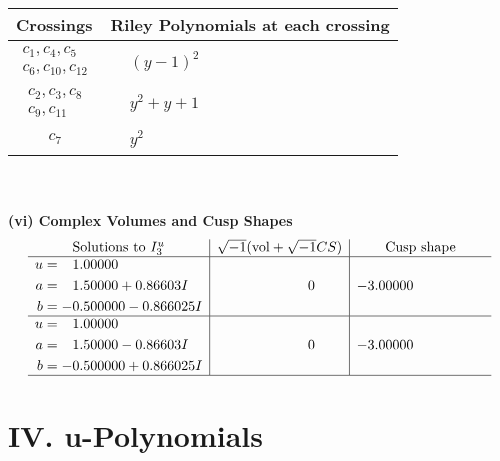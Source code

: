 \documentclass[1p]{elsarticle_modified}
\theoremstyle{definition}
\newcommand{\I}{\sqrt{-1}}
\begin{document}
\begin{tabular}{m{50pt}|m{274pt}}
Crossings & \hspace{64pt}Riley Polynomials at each crossing \\
\hline $$\begin{aligned}c_{1},c_{4},c_{5}\\c_{6},c_{10},c_{12}\end{aligned}$$&$\begin{aligned}
&(y-1)^2
\end{aligned}$\\
\hline $$\begin{aligned}c_{2},c_{3},c_{8}\\c_{9},c_{11}\end{aligned}$$&$\begin{aligned}
&y^2+y+1
\end{aligned}$\\
\hline $$\begin{aligned}c_{7}\end{aligned}$$&$\begin{aligned}
&y^2
\end{aligned}$\\
\hline
\end{tabular}\\~\\
\newpage\flushleft \textbf{(vi) Complex Volumes and Cusp Shapes}
$$\begin{array}{c|c|c}  
\text{Solutions to }I^u_{3}& \I (\text{vol} + \sqrt{-1}CS) & \text{Cusp shape}\\
 \hline 
\begin{aligned}
u &= \phantom{-}1.00000\phantom{ +0.000000I} \\
a &= \phantom{-}1.50000 + 0.86603 I \\
b &= -0.500000 - 0.866025 I\end{aligned}
 & \phantom{-0.000000 } 0 & -3.00000\phantom{ +0.000000I} \\ \hline\begin{aligned}
u &= \phantom{-}1.00000\phantom{ +0.000000I} \\
a &= \phantom{-}1.50000 - 0.86603 I \\
b &= -0.500000 + 0.866025 I\end{aligned}
 & \phantom{-0.000000 } 0 & -3.00000\phantom{ +0.000000I}\\
 \hline 
 \end{array}$$\newpage
\newpage\renewcommand{\arraystretch}{1}
\centering \section*{ IV. u-Polynomials}
\end{document}

